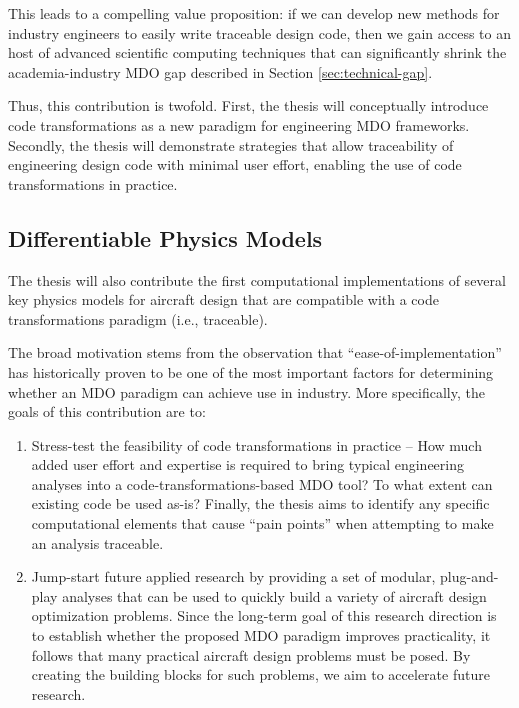\documentclass[12pt,vi,oneside]{report}
\begin{document}
    This leads to a compelling value proposition: if we can develop new methods for industry engineers to easily write traceable design code, then we gain access to an host of advanced scientific computing techniques that can significantly shrink the academia-industry MDO gap described in Section \ref{sec:technical-gap}.

    Thus, this contribution is twofold. First, the thesis will conceptually introduce code transformations as a new paradigm for engineering MDO frameworks. Secondly, the thesis will demonstrate strategies that allow traceability of engineering design code with minimal user effort, enabling the use of code transformations in practice.

    \subsection{Differentiable Physics Models}

    The thesis will also contribute the first computational implementations of several key physics models for aircraft design that are compatible with a code transformations paradigm (i.e., traceable).

    The broad motivation stems from the observation that ``ease-of-implementation'' has historically proven to be one of the most important factors for determining whether an MDO paradigm can achieve use in industry. More specifically, the goals of this contribution are to:

    \begin{enumerate}
        \item Stress-test the feasibility of code transformations in practice -- How much added user effort and expertise is required to bring typical engineering analyses into a code-transformations-based MDO tool? To what extent can existing code be used as-is? Finally, the thesis aims to identify any specific computational elements that cause ``pain points'' when attempting to make an analysis traceable.
        \item Jump-start future applied research by providing a set of modular, plug-and-play analyses that can be used to quickly build a variety of aircraft design optimization problems. Since the long-term goal of this research direction is to establish whether the proposed MDO paradigm improves practicality, it follows that many practical aircraft design problems must be posed. By creating the building blocks for such problems, we aim to accelerate future research.
    \end{enumerate}
\end{document}
